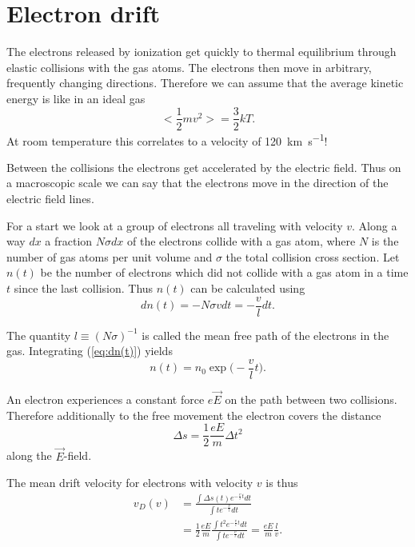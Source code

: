 \documentclass[12pt]{article}
\begin{document}
\section{Electron drift}

The electrons released by ionization get quickly to thermal equilibrium through elastic collisions with the gas atoms. The electrons then move in arbitrary, frequently changing directions. Therefore we can assume that the average kinetic energy is like in an ideal gas
\begin{equation}
< \frac{1}{2} m v^2 > = \frac{3}{2} k T.
\end{equation}
At room temperature this correlates to a velocity of \SI{120}{\kilo\meter\per\second}!

Between the collisions the electrons get accelerated by the electric field. Thus on a macroscopic scale we can say that the electrons move in the direction of the electric field lines.   

For a start we look at a group of electrons all traveling with velocity $v$. Along a way $dx$ a fraction $N \sigma dx$ of the electrons collide with a gas atom, where $N$ is the number of gas atoms per unit volume and $\sigma$ the total collision cross section. Let $n(t)$ be the number of electrons which did not collide with a gas atom in a time $t$ since the last collision. Thus $n(t)$ can be calculated using
\begin{equation}
dn(t) = - N \sigma v dt = -\frac{v}{l} dt.
\label{eq:dn(t)}
\end{equation}

The quantity $l \equiv (N \sigma)^{-1}$ is called the mean free path of the electrons in the gas. Integrating (\ref{eq:dn(t)}) yields
\begin{equation}
n(t) = n_0 \exp\Big(-\frac{v}{l} t \Big).
\end{equation}

An electron experiences a constant force $e \vec{E}$ on the path between two collisions. Therefore additionally to the free movement the electron covers the distance 
\begin{equation}
\Delta s = \frac{1}{2} \frac{eE}{m} \Delta t^2
\end{equation}
along the $\vec{E}$-field.

The mean drift velocity for electrons with velocity $v$ is thus
\begin{align*}
 v_D(v) & = \frac{\int \Delta s(t) e^{-\frac{v}{l} t}dt}{\int t e^{-\frac{v}{l}}dt} \\
 & = \frac{1}{2}\frac{eE}{m} \frac{\int t^2 e^{-\frac{v}{l} t}dt}{\int t e^{-\frac{v}{l}}dt} = \frac{eE}{m} \frac{l}{v}.
\end{align*}
\end{document}
